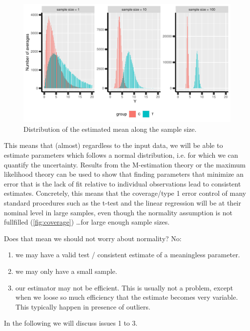 \documentclass[12pt]{article}
\begin{document}
\begin{figure}[!h]
\centering
\includegraphics[width=\textwidth]{./figures/examples-histAverage.pdf}
\caption{\label{fig:distAverage}Distribution of the estimated mean along the sample size.}
\end{figure}

This means that (almost) regardless to the input data, we will be able
to estimate parameters which follows a normal distribution, i.e. for
which we can quantify the uncertainty. Results from the M-estimation
theory or the maximum likelihood theory can be used to show that
finding parameters that minimize an error that is the lack of fit
relative to individual observations lead to consistent
estimates. Concretely, this means that the coverage/type 1 error
control of many standard procedures such as the t-test and the linear
regression will be at their nominal level in large samples, even
though the normality assumption is not fullfilled
(\autoref{fig:coverage}) \ldots for large enough sample sizes.

\clearpage

\noindent Does that mean we should not worry about normality? No:
\begin{enumerate}
\item we may have a valid test / consistent estimate of a meaningless
parameter.
\item we may only have a small sample.
\item our estimator may not be efficient. This is usually not a problem,
except when we loose so much efficiency that the estimate becomes
very variable. This typically happen in presence of outliers.
\end{enumerate}
In the following we will discuss issues 1 to 3.
\end{document}
